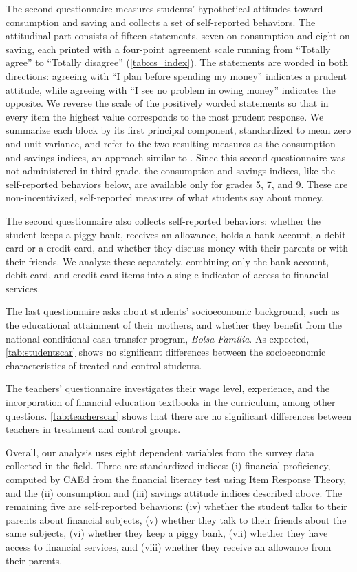 The second questionnaire measures students’  hypothetical attitudes toward consumption and saving and collects a set of self-reported behaviors. The attitudinal part consists of fifteen statements, seven on consumption and eight on saving, each printed with a four-point agreement scale running from “Totally agree” to “Totally disagree” (\autoref{tab:cs_index}). The statements are worded in both directions: agreeing with “I plan before spending my money” indicates a prudent attitude, while agreeing with “I see no problem in owing money” indicates the opposite. We reverse the scale of the positively worded statements so that in every item the highest value corresponds to the most prudent response. We summarize each block by its first principal component, standardized to mean zero and unit variance, and refer to the two resulting measures as the consumption and savings indices, an approach similar to \cite{Bruhn2016}. Since this second questionnaire was not administered in third-grade, the consumption and savings indices, like the self-reported behaviors below, are available only for grades 5, 7, and 9. These are non-incentivized, self-reported measures of what students say about money.

The second questionnaire also collects self-reported behaviors: whether the student keeps a piggy bank, receives an allowance, holds a bank account, a debit card or a credit card, and whether they discuss money with their parents or with their friends. We analyze these separately, combining only the bank account, debit card, and credit card items into a single indicator of access to financial services.

The last questionnaire asks about students' socioeconomic background, such as the educational attainment of their mothers, and whether they benefit from the national conditional cash transfer program, \textit{Bolsa Família}. As expected, \autoref{tab:studentscar} shows no significant differences between the socioeconomic characteristics of treated and control students.

The teachers' questionnaire investigates their wage level, experience, and the incorporation of financial education textbooks in the curriculum, among other questions. \autoref{tab:teacherscar} shows that there are no significant differences between teachers in treatment and control groups.

Overall, our analysis uses eight dependent variables from the survey data collected in the field. Three are standardized indices: (i) financial proficiency, computed by CAEd from the financial literacy test using Item Response Theory, and the (ii) consumption and (iii) savings attitude indices described above. The remaining five are self-reported behaviors: (iv) whether the student talks to their parents about financial subjects, (v) whether they talk to their friends about the same subjects, (vi) whether they keep a piggy bank, (vii) whether they have access to financial services, and (viii) whether they receive an allowance from their parents.



